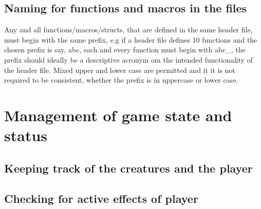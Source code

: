 \documentclass{report}
\begin{document}
\subsection*{Naming for functions and macros in the files}
Any and all functions/macros/structs, that are defined in the same header file, must begin with the same prefix, e.g if a header file defines 10 functions and the chosen prefix is say, abc, each and every function must begin with abc\_, the prefix should ideally be a descriptive acronym om the intended functionality of the header file. Mixed upper and lower case are permitted and it it is not required to be consistent, whether the prefix is in uppercase or lower case.
\section*{Management of game state and status}
\subsection*{Keeping track of the creatures and the player}

\subsection*{Checking for active effects of player}
\end{document}
